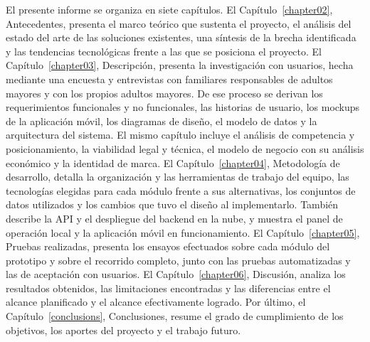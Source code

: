 El presente informe se organiza en siete capítulos.
El Capítulo~\ref{chapter02}, Antecedentes, presenta el marco teórico que sustenta el proyecto, el análisis del estado del arte de las soluciones existentes, una síntesis de la brecha identificada y las tendencias tecnológicas frente a las que se posiciona el proyecto.
El Capítulo~\ref{chapter03}, Descripción, presenta la investigación con usuarios, hecha mediante una encuesta y entrevistas con familiares responsables de adultos mayores y con los propios adultos mayores.
De ese proceso se derivan los requerimientos funcionales y no funcionales, las historias de usuario, los mockups de la aplicación móvil, los diagramas de diseño, el modelo de datos y la arquitectura del sistema.
El mismo capítulo incluye el análisis de competencia y posicionamiento, la viabilidad legal y técnica, el modelo de negocio con su análisis económico y la identidad de marca.
El Capítulo~\ref{chapter04}, Metodología de desarrollo, detalla la organización y las herramientas de trabajo del equipo, las tecnologías elegidas para cada módulo frente a sus alternativas, los conjuntos de datos utilizados y los cambios que tuvo el diseño al implementarlo.
También describe la API y el despliegue del backend en la nube, y muestra el panel de operación local y la aplicación móvil en funcionamiento.
El Capítulo~\ref{chapter05}, Pruebas realizadas, presenta los ensayos efectuados sobre cada módulo del prototipo y sobre el recorrido completo, junto con las pruebas automatizadas y las de aceptación con usuarios.
El Capítulo~\ref{chapter06}, Discusión, analiza los resultados obtenidos, las limitaciones encontradas y las diferencias entre el alcance planificado y el alcance efectivamente logrado.
Por último, el Capítulo~\ref{conclusions}, Conclusiones, resume el grado de cumplimiento de los objetivos, los aportes del proyecto y el trabajo futuro.